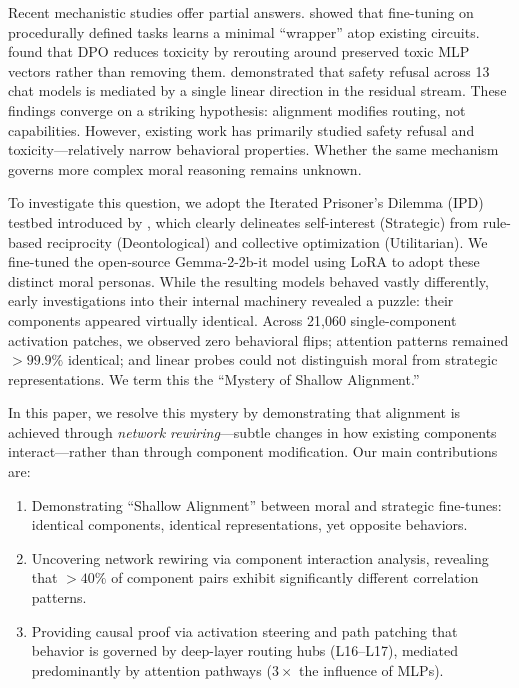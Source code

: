 \documentclass[11pt, letterpaper]{article}
\begin{document}
Recent mechanistic studies offer partial answers. \citet{jain2023mechanistically} showed that fine-tuning on procedurally defined tasks learns a minimal ``wrapper'' atop existing circuits. \citet{lee2024mechanistic} found that DPO reduces toxicity by rerouting around preserved toxic MLP vectors rather than removing them. \citet{arditi2024refusal} demonstrated that safety refusal across 13 chat models is mediated by a single linear direction in the residual stream. These findings converge on a striking hypothesis: alignment modifies routing, not capabilities. However, existing work has primarily studied safety refusal and toxicity---relatively narrow behavioral properties. Whether the same mechanism governs more complex moral reasoning remains unknown.

To investigate this question, we adopt the Iterated Prisoner's Dilemma (IPD) testbed introduced by \citet{tennant2024moral}, which clearly delineates self-interest (Strategic) from rule-based reciprocity (Deontological) and collective optimization (Utilitarian). We fine-tuned the open-source Gemma-2-2b-it model using LoRA to adopt these distinct moral personas. While the resulting models behaved vastly differently, early investigations into their internal machinery revealed a puzzle: their components appeared virtually identical. Across 21,060 single-component activation patches, we observed zero behavioral flips; attention patterns remained $>99.9\%$ identical; and linear probes could not distinguish moral from strategic representations. We term this the ``Mystery of Shallow Alignment.''

In this paper, we resolve this mystery by demonstrating that alignment is achieved through \textit{network rewiring}---subtle changes in how existing components interact---rather than through component modification. Our main contributions are:

\begin{enumerate}
  \item Demonstrating ``Shallow Alignment'' between moral and strategic fine-tunes: identical components, identical representations, yet opposite behaviors.
  \item Uncovering network rewiring via component interaction analysis, revealing that $>40\%$ of component pairs exhibit significantly different correlation patterns.
  \item Providing causal proof via activation steering and path patching that behavior is governed by deep-layer routing hubs (L16--L17), mediated predominantly by attention pathways ($3\times$ the influence of MLPs).
\end{enumerate}
\end{document}
